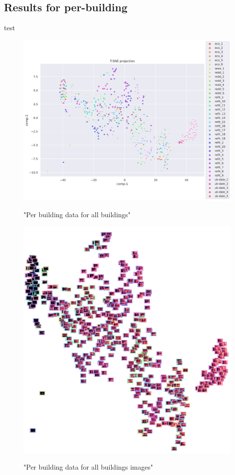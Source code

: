 \subsection{Results for per-building}
test
\begin{figure}[H]
	\centering
	\caption{"Per building data for all buildings"}
	\includegraphics[width=1.2\textwidth]{Figures/TSNE/TSNE_per_building/non_norm/scatter_non_norm_all.png}
	\label{fig:tsne_scatter_non_norm_all}
\end{figure}

\begin{figure}[H]
	\centering
	\caption{"Per building data for all buildings images"}
	\includegraphics[width=.9\textwidth]{Figures/TSNE/TSNE_per_building/non_norm/img_scatter_allall.png}
	\label{fig:tsne_pb_img_scatter_allall}
\end{figure}

